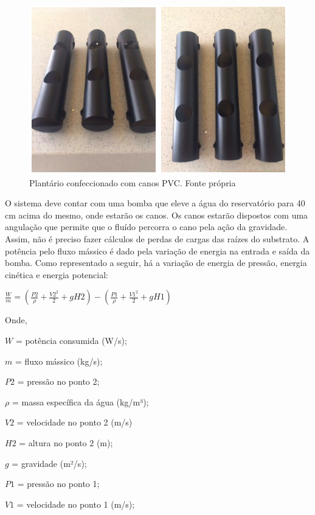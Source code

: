 \begin{figure}[H]
	\centering
	\includegraphics[width=13cm]{figuras/pvc.png}
	\caption{Plantário confeccionado com canos PVC. Fonte própria}
	\label{pvc}
\end{figure}

O sistema deve contar com uma bomba que eleve a água do reservatório para 40 cm acima do mesmo, onde estarão os canos. Os canos estarão dispostos com uma angulação que permite que o fluído percorra o cano pela ação da gravidade. Assim, não é preciso fazer cálculos de perdas de cargas das raízes do substrato. A potência pelo fluxo mássico é dado pela variação de energia na entrada e saída da bomba. Como representado a seguir, há a variação de energia de pressão, energia cinética e energia potencial:

\begin{center}
	${\displaystyle\frac{W}{m} = (\frac{P2}{\rho} + \frac{V2^2}{2} + gH2) - (\frac{P1}{\rho} + \frac{V1^2}{2} + gH1)}$	
\end{center}

Onde, 

$W$ = potência consumida (W/s);

$m$ = fluxo mássico (kg/s);

$P2$ = pressão no ponto 2;

$\rho$ = massa específica da água (kg/m³);

$V2$ = velocidade no ponto 2 (m/s)

$H2$ = altura no ponto 2 (m);

$g$ = gravidade (m²/s);

$P1$ = pressão no ponto 1;

$V1$ = velocidade no ponto 1 (m/s);

